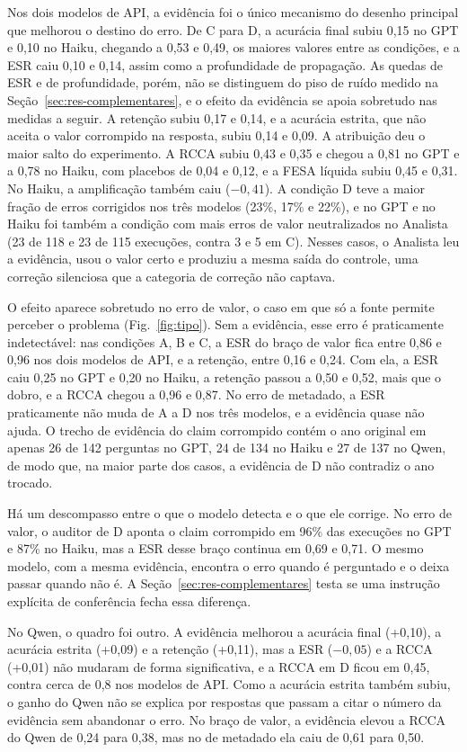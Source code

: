 Nos dois modelos de API, a evidência foi o único mecanismo do desenho principal que melhorou o destino do erro.
De C para D, a acurácia final subiu 0,15 no GPT e 0,10 no Haiku, chegando a 0,53 e 0,49, os maiores valores entre as condições, e a ESR caiu 0,10 e 0,14, assim como a profundidade de propagação. As quedas de ESR e de profundidade, porém, não se distinguem do piso de ruído medido na Seção~\ref{sec:res-complementares}, e o efeito da evidência se apoia sobretudo nas medidas a seguir.
A retenção subiu 0,17 e 0,14, e a acurácia estrita, que não aceita o valor corrompido na resposta, subiu 0,14 e 0,09.
A atribuição deu o maior salto do experimento. A RCCA subiu 0,43 e 0,35 e chegou a 0,81 no GPT e a 0,78 no Haiku, com placebos de 0,04 e 0,12, e a FESA líquida subiu 0,45 e 0,31.
No Haiku, a amplificação também caiu ($-0{,}41$).
A condição D teve a maior fração de erros corrigidos nos três modelos (23\%, 17\% e 22\%), e no GPT e no Haiku foi também a condição com mais erros de valor neutralizados no Analista (23 de 118 e 23 de 115 execuções, contra 3 e 5 em C). Nesses casos, o Analista leu a evidência, usou o valor certo e produziu a mesma saída do controle, uma correção silenciosa que a categoria de correção não captava.

O efeito aparece sobretudo no erro de valor, o caso em que só a fonte permite perceber o problema (Fig.~\ref{fig:tipo}).
Sem a evidência, esse erro é praticamente indetectável: nas condições A, B e C, a ESR do braço de valor fica entre 0,86 e 0,96 nos dois modelos de API, e a retenção, entre 0,16 e 0,24.
Com ela, a ESR caiu 0,25 no GPT e 0,20 no Haiku, a retenção passou a 0,50 e 0,52, mais que o dobro, e a RCCA chegou a 0,96 e 0,87.
No erro de metadado, a ESR praticamente não muda de A a D nos três modelos, e a evidência quase não ajuda. O trecho de evidência do claim corrompido contém o ano original em apenas 26 de 142 perguntas no GPT, 24 de 134 no Haiku e 27 de 137 no Qwen, de modo que, na maior parte dos casos, a evidência de D não contradiz o ano trocado.

Há um descompasso entre o que o modelo detecta e o que ele corrige.
No erro de valor, o auditor de D aponta o claim corrompido em 96\% das execuções no GPT e 87\% no Haiku, mas a ESR desse braço continua em 0,69 e 0,71.
O mesmo modelo, com a mesma evidência, encontra o erro quando é perguntado e o deixa passar quando não é. A Seção~\ref{sec:res-complementares} testa se uma instrução explícita de conferência fecha essa diferença.

No Qwen, o quadro foi outro.
A evidência melhorou a acurácia final (+0,10), a acurácia estrita (+0,09) e a retenção (+0,11), mas a ESR ($-0{,}05$) e a RCCA (+0,01) não mudaram de forma significativa, e a RCCA em D ficou em 0,45, contra cerca de 0,8 nos modelos de API.
Como a acurácia estrita também subiu, o ganho do Qwen não se explica por respostas que passam a citar o número da evidência sem abandonar o erro.
No braço de valor, a evidência elevou a RCCA do Qwen de 0,24 para 0,38, mas no de metadado ela caiu de 0,61 para 0,50.

